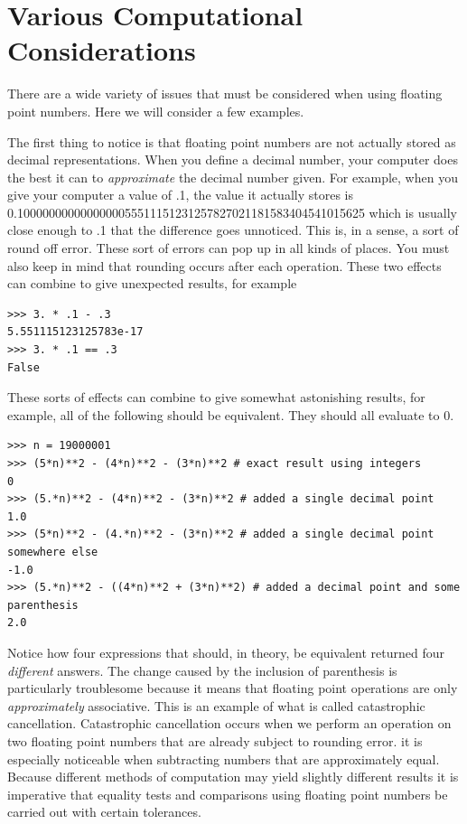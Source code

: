 \section*{Various Computational Considerations}

There are a wide variety of issues that must be considered when using floating point numbers.
Here we will consider a few examples.

The first thing to notice is that floating point numbers are not actually stored as decimal representations.
When you define a decimal number, your computer does the best it can to \emph{approximate} the decimal number given.
For example, when you give your computer a value of .1, the value it actually stores is 0.1000000000000000055511151231257827021181583404541015625 which is usually close enough to .1 that the difference goes unnoticed.
This is, in a sense, a sort of round off error.
These sort of errors can pop up in all kinds of places.
You must also keep in mind that rounding occurs after each operation.
These two effects can combine to give unexpected results, for example
\begin{lstlisting}
>>> 3. * .1 - .3
5.551115123125783e-17
>>> 3. * .1 == .3
False
\end{lstlisting}
These sorts of effects can combine to give somewhat astonishing results, for example, all of the following should be equivalent.
They should all evaluate to 0.
\begin{lstlisting}
>>> n = 19000001
>>> (5*n)**2 - (4*n)**2 - (3*n)**2 # exact result using integers
0
>>> (5.*n)**2 - (4*n)**2 - (3*n)**2 # added a single decimal point
1.0
>>> (5*n)**2 - (4.*n)**2 - (3*n)**2 # added a single decimal point somewhere else
-1.0
>>> (5.*n)**2 - ((4*n)**2 + (3*n)**2) # added a decimal point and some parenthesis
2.0
\end{lstlisting}
Notice how four expressions that should, in theory, be equivalent returned four \emph{different} answers.
The change caused by the inclusion of parenthesis is particularly troublesome because it means that floating point operations are only \emph{approximately} associative.
This is an example of what is called catastrophic cancellation.
Catastrophic cancellation occurs when we perform an operation on two floating point numbers that are already subject to rounding error.
it is especially noticeable when subtracting numbers that are approximately equal.
Because different methods of computation may yield slightly different results it is imperative that equality tests and comparisons using floating point numbers be carried out with certain tolerances.
